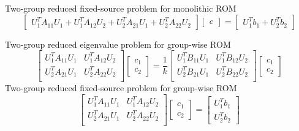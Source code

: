 \documentclass[12pt]{article}
\begin{document}
Two-group reduced fixed-source problem for monolithic ROM
\[
\begin{bmatrix}
U^T_1 A_{11} U_1 +  U^T_1 A_{12} U_2 +
U^T_2 A_{21} U_1 +  U^T_2 A_{22} U_2 
\end{bmatrix}
\begin{bmatrix}
c
\end{bmatrix}
=
\begin{bmatrix}
U^T_1 b_1 + U^T_2 b_2
\end{bmatrix}
\]



Two-group reduced eigenvalue problem for group-wise ROM
\[
\begin{bmatrix}
U^T_1 A_{11} U_1 &  U^T_1 A_{12} U_2 \\
U^T_2 A_{21} U_1 &  U^T_2 A_{22} U_2 \\
\end{bmatrix}
\begin{bmatrix}
c_1\\c_2
\end{bmatrix}
=
\frac{1}{k}
\begin{bmatrix}
U^T_1 B_{11} U_1 &  U^T_1 B_{12} U_2 \\
U^T_2 B_{21} U_1 &  U^T_2 B_{22} U_2 \\
\end{bmatrix}
\begin{bmatrix}
c_1\\c_2
\end{bmatrix}
\]
Two-group reduced fixed-source problem for group-wise ROM
\[
\begin{bmatrix}
U^T_1 A_{11} U_1 &  U^T_1 A_{12} U_2 \\
U^T_2 A_{21} U_1 &  U^T_2 A_{22} U_2 \\
\end{bmatrix}
\begin{bmatrix}
c_1\\c_2
\end{bmatrix}
=
\begin{bmatrix}
U^T_1 b_1\\ U^T_2 b_2
\end{bmatrix}
\]



\bigskip
\end{document}
